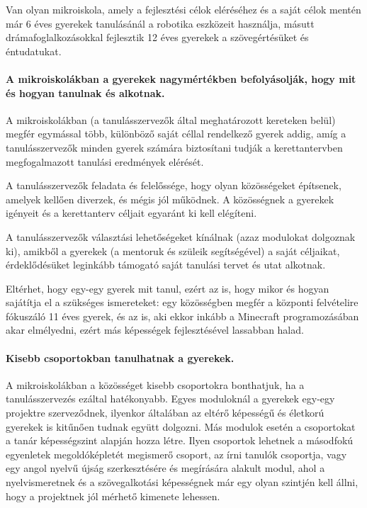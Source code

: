 Van olyan mikroiskola, amely a fejlesztési célok eléréséhez és a saját célok mentén már 6 éves gyerekek tanulásánál a robotika eszközeit használja, másutt drámafoglalkozásokkal fejlesztik 12 éves gyerekek a szövegértésüket és éntudatukat.

\paragraph{A mikroiskolákban a gyerekek nagymértékben befolyásolják, hogy mit és hogyan tanulnak és alkotnak.}
A mikroiskolákban (a tanulásszervezők által meghatározott kereteken
belül) megfér egymással több, különböző saját céllal rendelkező gyerek
addig, amíg a tanulásszervezők minden gyerek számára biztosítani
tudják a kerettantervben megfogalmazott tanulási\linebreak
eredmények elérését.

A tanulásszervezők feladata és felelőssége, hogy olyan közösségeket építsenek, amelyek kellően diverzek, és mégis jól működnek. A közösségnek a gyerekek igényeit és a kerettanterv céljait egyaránt ki kell elégíteni.

A tanulásszervezők választási lehetőségeket kínálnak (azaz modulokat dolgoznak ki), amikből a gyerekek (a mentoruk és szüleik segítségével) a saját céljaikat, érdeklődésüket leginkább támogató saját tanulási tervet és utat alkotnak.

Eltérhet, hogy egy-egy gyerek mit tanul, ezért az is, hogy mikor és hogyan sajátítja el a szükséges ismereteket: egy közösségben megfér a központi felvételire fókuszáló 11 éves gyerek, és az is, aki ekkor inkább a Minecraft programozásában akar elmélyedni, ezért más képességek fejlesztésével lassabban halad.

\paragraph{Kisebb csoportokban tanulhatnak a gyerekek.}
\label{sec:csoportbontasok}

A mikroiskolákban a közösséget kisebb csoportokra bonthatjuk, ha a tanulásszervezés ezáltal hatékonyabb. Egyes moduloknál a gyerekek egy-egy projektre szerveződnek, ilyenkor általában az eltérő képességű és életkorú gyerekek is kitűnően tudnak együtt dolgozni. Más modulok esetén a csoportokat a tanár képességszint alapján hozza létre. Ilyen csoportok lehetnek a másodfokú egyenletek megoldóképletét megismerő csoport, az írni tanulók csoportja, vagy egy angol nyelvű újság szerkesztésére és megírására alakult modul, ahol a nyelvismeretnek és a szövegalkotási képességnek már egy olyan szintjén kell állni, hogy a projektnek jól mérhető kimenete lehessen.

